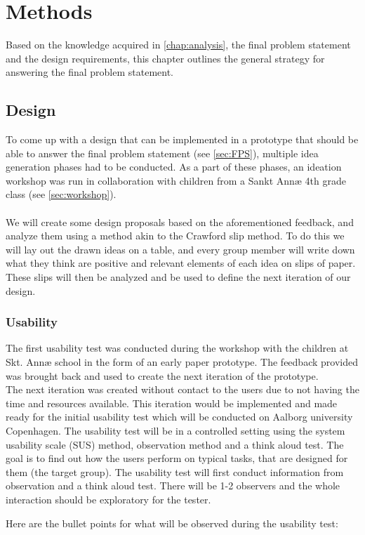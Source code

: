 \chapter{Methods}
Based on the knowledge acquired in \autoref{chap:analysis}, the final problem statement and the design requirements, this chapter outlines the general strategy for answering the final problem statement.
\section{Design}
To come up with a design that can be implemented in a prototype that should be able to answer the final problem statement (see \autoref{sec:FPS}), multiple idea generation phases had to be conducted. As a part of these phases, an ideation workshop was run in collaboration with children from a Sankt Annæ 4th grade class (see \autoref{sec:workshop}).\\\\
We will create some design proposals based on the aforementioned feedback, and analyze them using a method akin to the Crawford slip method\cite{crawfordSlip}. To do this we will lay out the drawn ideas on a table, and every group member will write down what they think are positive and relevant elements of each idea on slips of paper. These slips will then be analyzed and be used to define the next iteration of our design.

\subsection{Usability}
The first usability test was conducted during the workshop with the children at Skt. Annæ school in the form of an early paper prototype. The feedback provided was brought back and used to create the next iteration of the prototype. \\
The next iteration was created without contact to the users due to not having the time and resources available. This iteration would be implemented and made ready for the initial usability test which will be conducted on Aalborg university Copenhagen.
The usability test will be in a controlled setting using the system usability scale (SUS) method, observation method and a think aloud test. The goal is to find out how the users perform on typical tasks, that are designed for them (the target group). 
The usability test will first conduct information from observation and a think aloud test. There will be 1-2 observers and the whole interaction should be exploratory for the tester. \par
Here are the bullet points for what will be observed during the usability test:\par

